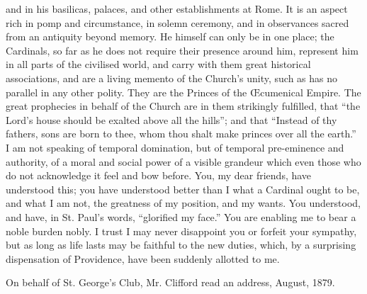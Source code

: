 and in his basilicas, palaces, and other establishments at Rome. It is
an aspect rich in pomp and circumstance, in solemn ceremony, and in
observances sacred from an antiquity beyond memory. He himself
can only be in one place; the Cardinals, so far as he does not require
their presence around him, represent him in all parts of the civilised
world, and carry with them great historical associations, and are a
living memento of the Church's unity, such as has no parallel in any
other polity. They are the Princes of the Œcumenical Empire. The
great prophecies in behalf of the Church are in them strikingly
fulfilled, that ``the Lord's house should be exalted above all the
hills''; and that ``Instead of thy fathers, sons are born to thee, whom
thou shalt make princes over all the earth.'' I am not speaking of
temporal domination, but of temporal pre-eminence and authority, of a
moral and social power of a visible grandeur which even those who do
not acknowledge it feel and bow before. You, my dear friends, have
understood this; you have understood better than I what a Cardinal
ought to be, and what I am not, the greatness of my position, and my
wants. You understood, and have, in St. Paul's words, ``glorified my
face.'' You are enabling me to bear a noble burden nobly. I trust I may
never disappoint you or forfeit your sympathy, but as long as life
lasts may be faithful to the new duties, which, by a surprising
dispensation of Providence, have been suddenly allotted to me.


On behalf of St. George's Club, Mr. Clifford read
an address, August, 1879.

